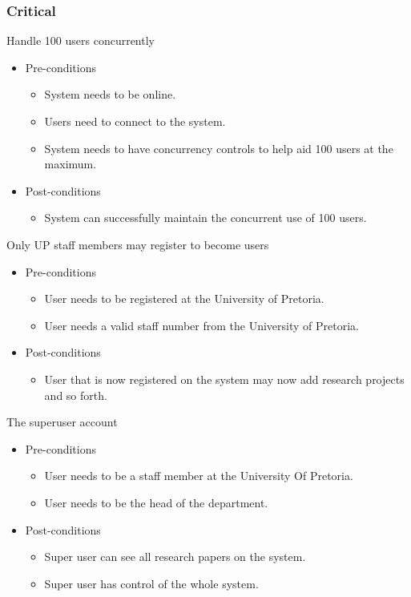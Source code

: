 \documentclass[a4paper,12pt]{report}
\begin{document}
\subsubsection{Critical}
	Handle 100 users concurrently
	\begin{itemize}
		\item Pre-conditions
			\begin{itemize}
				\item System needs to be online.
				\item Users need to connect to the system.
				\item System needs to have concurrency controls to help aid 100 users at the maximum.
			\end{itemize}
		\item Post-conditions
			\begin{itemize}
				\item System can successfully maintain the concurrent use of 100 users.
			\end{itemize}
	\end{itemize}

	Only UP staff members may register to become users
	\begin{itemize}
		\item Pre-conditions
			\begin{itemize}
				\item User needs to be registered at the University of Pretoria.
				\item User needs a valid staff number from the University of Pretoria.
			\end{itemize}
		\item Post-conditions
			\begin{itemize}
				\item User that is now registered on the system may now add research projects and so forth.
			\end{itemize}
	\end{itemize}

	The superuser account
	\begin{itemize}
		\item Pre-conditions
			\begin{itemize}
				\item User needs to be a staff member at the University Of Pretoria.
				\item User needs to be the head of the department.
			\end{itemize}
		\item Post-conditions
			\begin{itemize}
				\item Super user can see all research papers on the system.
				\item Super user has control of the whole system.
			\end{itemize}
	\end{itemize}
\end{document}
